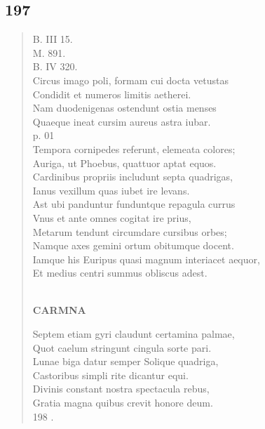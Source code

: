 \documentclass[11pt, a4paper]{report}
\begin{document}
            \subsection*{197}
      \begin{verse}
      B. III 15. \\ M. 891. \\ B. IV 320. \\ Circus imago poli, formam cui docta vetustas \\ Condidit et numeros limitis aetherei. \\ Nam duodenigenas ostendunt ostia menses \\ Quaeque ineat cursim aureus astra iubar. \\ p. 01 \\ Tempora cornipedes referunt, elemeata colores; \\ Auriga, ut Phoebus, quattuor aptat equos. \\ Cardinibus propriis includunt septa quadrigas, \\ Ianus vexillum quas iubet ire levans. \\ Ast ubi panduntur funduntque repagula currus \\ Vnus et ante omnes cogitat ire prius, \\ Metarum tendunt circumdare cursibus orbes; \\ Namque axes gemini ortum obitumque docent. \\ Iamque his Euripus quasi magnum interiacet aequor, \\ Et medius centri summus obliscus adest. \\ 
        ﻿\pagebreak 
     \marginpar{[162]} \begin{center} \textbf{CARMNA} \end{center}Septem etiam gyri claudunt certamina palmae, \\ Quot caelum stringunt cingula sorte pari. \\ Lunae biga datur semper Solique quadriga, \\ Castoribus simpli rite dicantur equi. \\ Divinis constant nostra spectacula rebus, \\ Gratia magna quibus crevit honore deum. \\ 198 . \\ 
      \end{verse}
  
\end{document}

